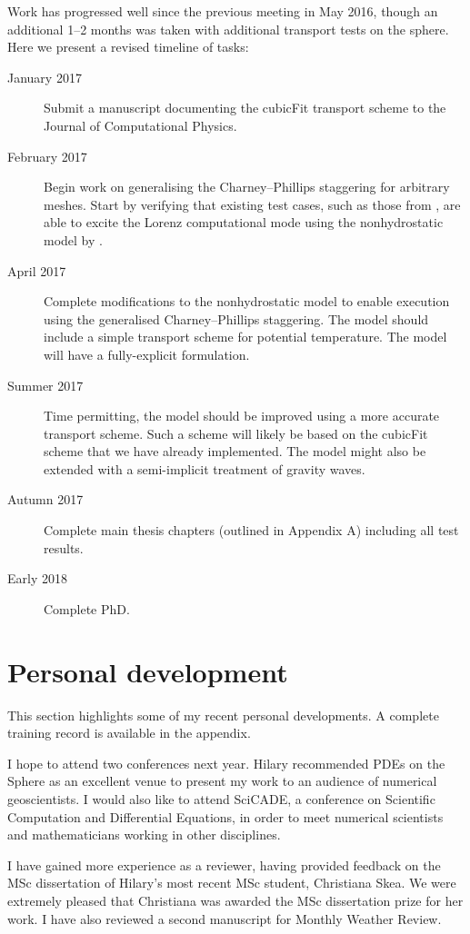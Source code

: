\documentclass[a4paper,11pt]{article}
\begin{document}
Work has progressed well since the previous meeting in May 2016, though an additional 1--2 months was taken with additional transport tests on the sphere.  Here we present a revised timeline of tasks:
\begin{description}
\item[January 2017]{Submit a manuscript documenting the cubicFit transport scheme to the Journal of Computational Physics.}
\item[February 2017]{Begin work on generalising the Charney--Phillips staggering for arbitrary meshes.  Start by verifying that existing test cases, such as those from \citet{arakawa-konor1996}, are able to excite the Lorenz computational mode using the nonhydrostatic model by \citet{weller-shahrokhi2014}.}
\item[April 2017]{Complete modifications to the nonhydrostatic model to enable execution using the generalised Charney--Phillips staggering.  The model should include a simple transport scheme for potential temperature.  The model will have a fully-explicit formulation.}
\item[Summer 2017]{Time permitting, the model should be improved using a more accurate transport scheme.  Such a scheme will likely be based on the cubicFit scheme that we have already implemented.  The model might also be extended with a semi-implicit treatment of gravity waves.}
\item[Autumn 2017]{Complete main thesis chapters (outlined in Appendix A) including all test results.}
\item[Early 2018]{Complete PhD.}
\end{description}

\section{Personal development}
This section highlights some of my recent personal developments.  A complete training record is available in the appendix.

I hope to attend two conferences next year.  Hilary recommended PDEs on the Sphere as an excellent venue to present my work to an audience of numerical geoscientists.  I would also like to attend SciCADE, a conference on Scientific Computation and Differential Equations, in order to meet numerical scientists and mathematicians working in other disciplines.

I have gained more experience as a reviewer, having provided feedback on the MSc dissertation of Hilary's most recent MSc student, Christiana Skea.  We were extremely pleased that Christiana was awarded the MSc dissertation prize for her work.  I have also reviewed a second manuscript for Monthly Weather Review.
\end{document}
